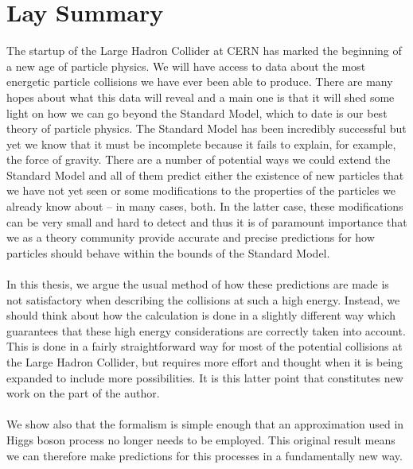 \chapter*{Lay Summary}

\noindent

\normalsize

The startup of the Large Hadron Collider at CERN has marked the beginning of a new age of particle physics. We will have access to data about the most energetic particle collisions we have ever been able to produce. There are many hopes about what this data will reveal and a main one is that it will shed some light on how we can go beyond the Standard Model, which to date is our best theory of particle physics. The Standard Model has been incredibly successful but yet we know that it must be incomplete because it fails to explain, for example, the force of gravity. There are a number of potential ways we could extend the Standard Model and all of them predict either the existence of new particles that we have not yet seen or some modifications to the properties of the particles we already know about -- in many cases, both. In the latter case, these modifications can be very small and hard to detect and thus it is of paramount importance that we as a theory community provide accurate and precise predictions for how particles should behave within the bounds of the Standard Model. \\
\\
In this thesis, we argue the usual method of how these predictions are made is not satisfactory when describing the collisions at such a high energy. Instead, we should think about how the calculation is done in a slightly different way which guarantees that these high energy considerations are correctly taken into account. This is done in a fairly straightforward way for most of the potential collisions at the Large Hadron Collider, but requires more effort and thought when it is being expanded to include more possibilities. It is this latter point that constitutes new work on the part of the author. \\
\\
We show also that the formalism is simple enough that an approximation used in Higgs boson process no longer needs to be employed. This original result means we can therefore make predictions for this processes in a fundamentally new way. 

